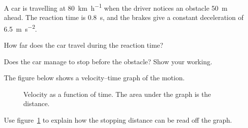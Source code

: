 \documentclass[12pt]{article}
\begin{document}
%
\clearpage
{}


\begin{exercise}
A car is travelling at \qty{80}{\kilo\metre\per\hour} when the driver notices an obstacle \qty{50}{\metre} ahead. The reaction time is \qty{0.8}{\second}, and the brakes give a constant deceleration of \qty{6.5}{\metre\per\second\squared}.

\begin{subproblems}
  \item How far does the car travel during the reaction time?
  \item Does the car manage to stop before the obstacle? Show your working.
\end{subproblems}

The figure below shows a velocity--time graph of the motion.

\begin{figure}[ht]
  \centering
  \caption{Velocity as a function of time. The area under the
           graph is the distance.}
  \label{fig:vt}
\end{figure}

\begin{subproblems}[resume]
  \item Use figure~\ref{fig:vt} to explain how the stopping distance can be read off the graph.
\end{subproblems}
\end{exercise}
\end{document}
